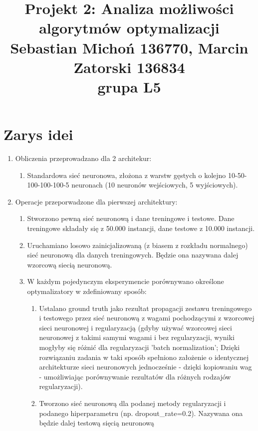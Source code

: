 \documentclass[12pt]{article}
\begin{document}
\title{Projekt 2: Analiza możliwości algorytmów optymalizacji\\
\large Sebastian Michoń 136770, Marcin Zatorski 136834\\
\large grupa L5}
\date{\vspace{-10ex}}
\maketitle

\section{Zarys idei}
\begin{enumerate}
	\item Obliczenia przeprowadzano dla 2 architekur:
	\begin{enumerate}
		\item Standardowa sieć neuronowa, złożona z warstw gęstych o kolejno 10-50-100-100-100-5 neuronach (10 neuronów wejściowych, 5 wyjściowych).
	\end{enumerate}
	\item Operacje przeporwadzone dla pierwszej architektury:
	\begin{enumerate}
		\item Stworzono pewną sieć neuronową i dane treningowe i testowe. Dane treningowe składały się z 50.000 instancji, dane testowe z 10.000 instancji.
		\item Uruchamiano losowo zainicjalizowaną (z biasem z rozkładu normalnego) sieć neuronową dla danych treningowych. Będzie ona nazywana dalej wzorcową siecią neuronową.
		\item W każdym pojedynczym eksperymencie porównywano określone optymalizatory w zdefiniowany sposób:
		\begin{enumerate}
			\item Ustalano ground truth jako rezultat propagacji zestawu treningowego i testowego przez sieć neuronową z wagami pochodzącymi z wzorcowej sieci neuronowej i regularyzacją (gdyby używać wzorcowej sieci neuronowej z takimi samymi wagami i bez regularyzacji, wyniki mogłyby się różnić dla regularyzacji 'batch  normalization'; Dzięki rozwiązaniu zadania w taki sposób spełniono założenie o identycznej architekturze sieci neuronowych jednocześnie - dzięki kopiowaniu wag - umożliwiając porównywanie rezultatów dla różnych rodzajów regularyzacji).
			\item Tworzono sieć neuronową dla podanej metody regularyzacji i podanego hiperparametru (np. dropout\_rate=0.2). Nazywana ona będzie dalej testową sięcią neuronową

\end{enumerate}
\end{enumerate}
\end{enumerate}
\end{document}
